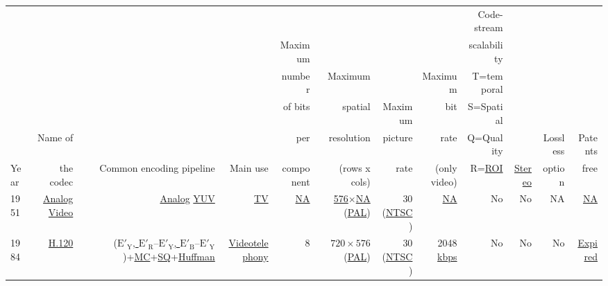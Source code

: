 \begin{tabular}{lrrrrrrrrrrr}
     &           &                          &          &           &              &         &              & Code-stream & & & \\
     &           &                          &          &   Maximum &              &         &              & scalability & & & \\
     &           &                          &          &     number&      Maximum &         &      Maximum &  T=temporal & & & \\
     &           &                          &          &   of bits &      spatial & Maximum &          bit &   S=Spatial & & & \\
     &   Name of &                          &          &       per &   resolution & picture &         rate &   Q=Quality & & Lossless & Patents \\
Year & the codec & Common encoding pipeline & Main use & component &(rows x cols) &    rate & (only video) &       R=\href{https://en.wikipedia.org/wiki/Region_of_interest}{ROI} & \href{https://en.wikipedia.org/wiki/Stereoscopy}{Stereo} & option & free\\
\hline

1951 & %
\href{https://en.wikipedia.org/wiki/Video#Analog_video}{Analog Video} & %
\href{https://en.wikipedia.org/wiki/Analog_signal}{Analog} \href{https://en.wikipedia.org/wiki/YUV}{YUV} & %
\href{https://en.wikipedia.org/wiki/Television}{TV} & %
\href{https://en.wikipedia.org/wiki/N/A}{NA} & %
\href{https://en.wikipedia.org/wiki/Interlaced_video}{576}$\times$\href{https://en.wikipedia.org/wiki/N/A}{NA} (\href{https://en.wikipedia.org/wiki/PAL}{PAL}) & %
30 (\href{https://en.wikipedia.org/wiki/NTSC}{NTSC}) & %
\href{https://en.wikipedia.org/wiki/N/A}{NA} & %
No & %
No & %
NA & %
\href{https://en.wikipedia.org/wiki/N/A}{NA} \\ %

1984 & %
\href{https://en.wikipedia.org/wiki/H.120}{H.120} & %
(\href{https://en.wikipedia.org/wiki/Chroma_subsampling#4:2:2}{$\text{E}'_\text{Y}$, $\text{E}'_\text{R} – \text{E}'_\text{Y}$, $\text{E}'_\text{B} – \text{E}'_\text{Y}$})+\href{https://en.wikipedia.org/wiki/Motion_compensation}{MC}+\href{https://en.wikipedia.org/wiki/Quantization_(signal_processing)}{SQ}+\href{https://en.wikipedia.org/wiki/Huffman_coding}{Huffman} & %
\href{https://en.wikipedia.org/wiki/Videotelephony}{Videotelephony} & %
8 & %
$720\times 576$ (\href{https://en.wikipedia.org/wiki/PAL}{PAL}) & %
30 (\href{https://en.wikipedia.org/wiki/NTSC}{NTSC}) & %
2048 \href{https://en.wikipedia.org/wiki/Data-rate_units}{kbps} & %
No & %
No & %
No & %
\href{https://en.wikipedia.org/wiki/Term_of_patent}{Expired} \\ %


\end{tabular}
